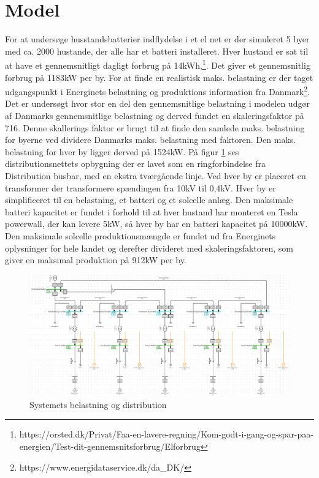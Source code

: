 

\label{Modelopbygning}

\section{Model}

For at undersøge husstandsbatterier indflydelse i et el net er der simuleret 5 byer med ca. 2000 hustande, der alle har et batteri installeret. Hver hustand er sat til at have et gennemsnitligt dagligt forbrug på 14kWh,\footnote{https://orsted.dk/Privat/Faa-en-lavere-regning/Kom-godt-i-gang-og-spar-paa-energien/Test-dit-gennemsnitsforbrug/Elforbrug}. Det giver et gennemsnitlig forbrug på 1183kW per by. For at finde en realistisk maks. belastning er der taget udgangspunkt i Energinets belastning og produktions information fra Danmark\footnote{https://www.energidataservice.dk/da\_DK/}. Det er undersøgt hvor stor en del den gennemsnitlige belastning i modelen udgør af Danmarks gennemsnitlige belastning og derved fundet en skaleringsfaktor på 716. Denne skallerings faktor er brugt til at finde den samlede maks. belastning for byerne ved dividere Danmarks maks. belastning med faktoren. Den maks. belastning for hver by ligger derved på 1524kW. 
På figur \ref{fig:Simdis} ses distributionsnettets opbygning der er lavet som en ringforbindelse fra Distribution busbar, med en ekstra tværgående linje. Ved hver by er placeret en transformer der transformere spændingen fra 10kV til 0,4kV. Hver by er simplificeret til en belastning, et batteri og et solcelle anlæg. Den maksimale batteri kapacitet er fundet i forhold til at hver hustand har monteret en Tesla powerwall, der kan levere 5kW, så hver by har en batteri kapacitet på 10000kW. Den maksimale solcelle produktionsmængde er fundet ud fra Energinets oplysninger for hele landet og derefter divideret med skaleringsfaktoren, som giver en maksimal produktion på 912kW per by. 

 
 \begin{figure}[H] %
 	\centering
 	\includegraphics[width=1\textwidth]{figurer/Sim_model_2}
 	\caption{Systemets belastning og distribution}
 	\label{fig:Simdis}
 \end{figure}
    

